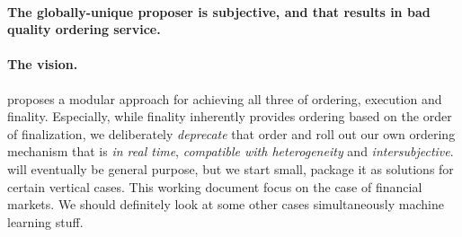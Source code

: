 \paragraph{The globally-unique proposer is subjective, and that results in bad quality ordering service.}


\paragraph{The vision.}
\sys proposes a modular approach for achieving all three of ordering, execution and finality.
Especially, while finality inherently provides ordering \ie based on the order of finalization, we deliberately \emph{deprecate} that order and roll out our own ordering mechanism that is \emph{in real time}, \emph{compatible with heterogeneity} and \emph{intersubjective}.
\sys will eventually be general purpose, but we start small, package it as solutions for certain vertical cases.
This working document focus on the case of financial markets.
We should definitely look at some other cases simultaneously \eg machine learning stuff.